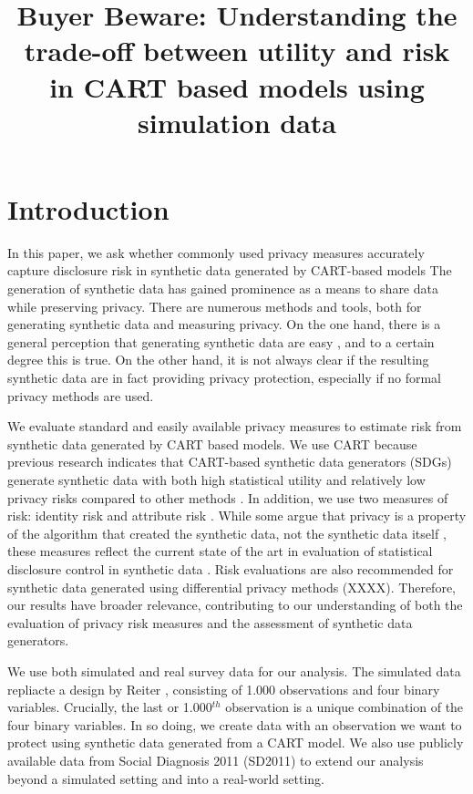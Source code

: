 \documentclass[a4paper,11pt]{style/uneceart}
\begin{document}


\title{Buyer Beware: Understanding the trade-off between utility and risk in CART based models using simulation data}

\section{Introduction}

In this paper, we ask whether commonly used privacy measures accurately capture disclosure risk in synthetic data generated by CART-based models  The generation of synthetic data has gained prominence as a means to share data while preserving privacy. There are numerous methods and tools, both for generating synthetic data and measuring privacy.  On the one hand, there is a general perception that generating synthetic data are easy \cite{latner2024generating}, and to a certain degree this is true.  On the other hand, it is not always clear if the resulting synthetic data are in fact providing privacy protection, especially if no formal privacy methods are used.

We evaluate standard and easily available privacy measures to estimate risk from synthetic data generated by CART based models.  We use CART because previous research indicates that CART-based synthetic data generators (SDGs) generate synthetic data with both high statistical utility and relatively low privacy risks compared to other methods \cite{little2025synthetic,fossing2024evaluation,dankar2021fake}.  In addition, we use two measures of risk: identity risk and attribute risk \cite{raab2025practicalprivacymetricssynthetic}.  While some argue that privacy is a property of the algorithm that created the synthetic data, not the synthetic data itself \cite{jordon2022synthetic}, these measures reflect the current state of the art in evaluation of statistical disclosure control in synthetic data \cite{raab2025practicalprivacymetricssynthetic}.  Risk evaluations are also recommended for synthetic data generated using differential privacy methods (XXXX).  Therefore, our results have broader relevance, contributing to our understanding of both the evaluation of privacy risk measures and the assessment of synthetic data generators.

We use both simulated and real survey data for our analysis. The simulated data repliacte a design by Reiter \cite{reiter2014bayesian}, consisting of 1.000 observations and four binary variables. Crucially, the last or 1.000$^{th}$ observation is a unique combination of the four binary variables.  In so doing, we create data with an observation we want to protect using synthetic data generated from a CART model.  We also use publicly available data from Social Diagnosis 2011 (SD2011) to extend our analysis beyond a simulated setting and into a real-world setting.
\end{document}
